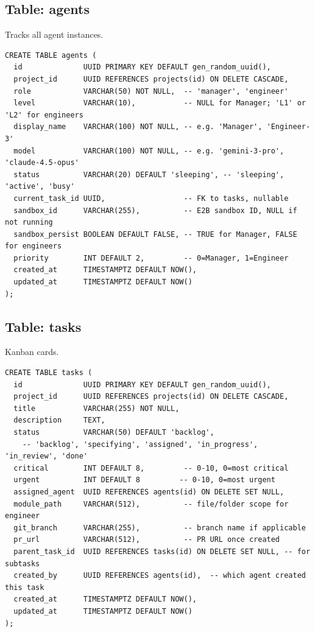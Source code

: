\documentclass[11pt,a4paper]{article}
\begin{document}
\subsection{Table: agents}

Tracks all agent instances.

\begin{lstlisting}
CREATE TABLE agents (
  id              UUID PRIMARY KEY DEFAULT gen_random_uuid(),
  project_id      UUID REFERENCES projects(id) ON DELETE CASCADE,
  role            VARCHAR(50) NOT NULL,  -- 'manager', 'engineer'
  level           VARCHAR(10),           -- NULL for Manager; 'L1' or 'L2' for engineers
  display_name    VARCHAR(100) NOT NULL, -- e.g. 'Manager', 'Engineer-3'
  model           VARCHAR(100) NOT NULL, -- e.g. 'gemini-3-pro', 'claude-4.5-opus'
  status          VARCHAR(20) DEFAULT 'sleeping', -- 'sleeping', 'active', 'busy'
  current_task_id UUID,                  -- FK to tasks, nullable
  sandbox_id      VARCHAR(255),          -- E2B sandbox ID, NULL if not running
  sandbox_persist BOOLEAN DEFAULT FALSE, -- TRUE for Manager, FALSE for engineers
  priority        INT DEFAULT 2,         -- 0=Manager, 1=Engineer
  created_at      TIMESTAMPTZ DEFAULT NOW(),
  updated_at      TIMESTAMPTZ DEFAULT NOW()
);
\end{lstlisting}

\subsection{Table: tasks}

Kanban cards.

\begin{lstlisting}
CREATE TABLE tasks (
  id              UUID PRIMARY KEY DEFAULT gen_random_uuid(),
  project_id      UUID REFERENCES projects(id) ON DELETE CASCADE,
  title           VARCHAR(255) NOT NULL,
  description     TEXT,
  status          VARCHAR(50) DEFAULT 'backlog',
    -- 'backlog', 'specifying', 'assigned', 'in_progress', 'in_review', 'done'
  critical        INT DEFAULT 8,         -- 0-10, 0=most critical
  urgent          INT DEFAULT 8         -- 0-10, 0=most urgent
  assigned_agent  UUID REFERENCES agents(id) ON DELETE SET NULL,
  module_path     VARCHAR(512),          -- file/folder scope for engineer
  git_branch      VARCHAR(255),          -- branch name if applicable
  pr_url          VARCHAR(512),          -- PR URL once created
  parent_task_id  UUID REFERENCES tasks(id) ON DELETE SET NULL, -- for subtasks
  created_by      UUID REFERENCES agents(id),  -- which agent created this task
  created_at      TIMESTAMPTZ DEFAULT NOW(),
  updated_at      TIMESTAMPTZ DEFAULT NOW()
);
\end{lstlisting}
\end{document}
